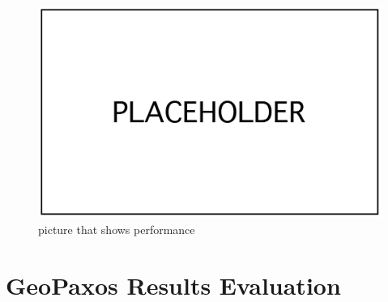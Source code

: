 \begin{figure}[!htb]
  \centering
  \includegraphics[width=\textwidth,height=\textheight,keepaspectratio]{img/placeholder.png}
  \caption[caption]{ picture that shows performance }
  \label{fig:variable-performance}
\end{figure}

\clearpage
\section{GeoPaxos Results Evaluation}\label{sec:geopaxos-results-evaluation}